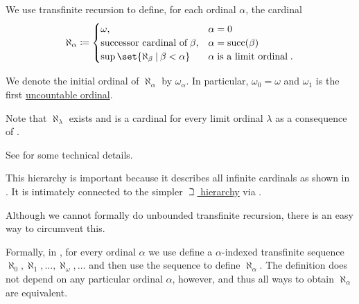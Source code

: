 \begin{definition}\label{def:aleph_hierarchy}
  We use transfinite recursion to define, for each ordinal \( \alpha \), the cardinal
  \begin{equation}\label{eq:def:aleph_hierarchy}
    \aleph_\alpha \coloneqq \begin{cases}
      \omega,                                        &\alpha = 0 \\
      \T{successor cardinal of} \beta,               &\alpha = \op{succ}(\beta) \\
      \sup\set{ \aleph_\beta \given \beta < \alpha } &\alpha \T{is a limit ordinal}.
    \end{cases}
  \end{equation}

  We denote the initial ordinal of \( \aleph_\alpha \) by \( \omega_\alpha \). In particular, \( \omega_0 = \omega \) and \( \omega_1 \) is the first \hyperref[def:set_countability/uncountable]{uncountable ordinal}.
\end{definition}
\begin{comments}
  \item Note that \( \aleph_\lambda \) exists and is a cardinal for every limit ordinal \( \lambda \) as a consequence of .

  \item See  for some technical details.

  \item This hierarchy is important because it describes all infinite cardinals as shown in . It is intimately connected to the simpler \hyperref[def:beth_hierarchy]{\( \beth \) hierarchy} via .
\end{comments}

\begin{remark}\label{rem:unbounded_transfinite_recursion}
  Although we cannot formally do unbounded transfinite recursion, there is an easy way to circumvent this.

  Formally, in , for every ordinal \( \alpha \) we use  define a \( \alpha \)-indexed transfinite sequence \( \aleph_0, \aleph_1, \ldots, \aleph_\omega, \ldots \) and then use the sequence to define \( \aleph_\alpha \). The definition does not depend on any particular ordinal \( \alpha \), however, and thus all ways to obtain \( \aleph_\alpha \) are equivalent.
\end{remark}

